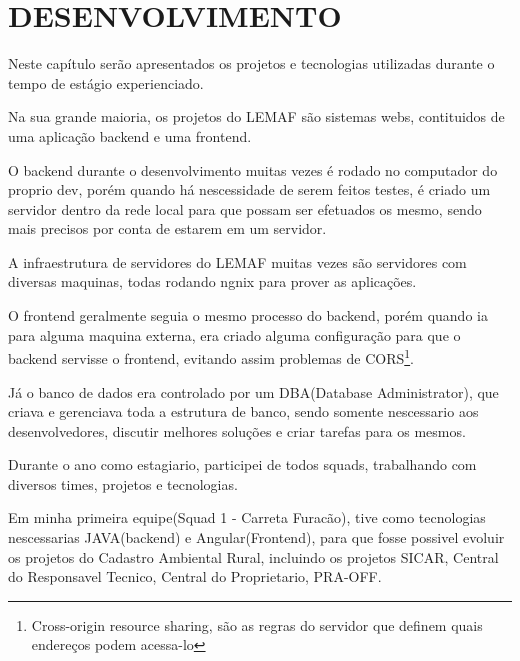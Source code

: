 \chapter{DESENVOLVIMENTO}
\label{cap:desenvolvimento}

Neste capítulo serão apresentados os projetos e tecnologias utilizadas durante o tempo de estágio experienciado.

Na sua grande maioria, os projetos do LEMAF são sistemas webs, contituidos de uma aplicação backend e uma frontend.

O backend durante o desenvolvimento muitas vezes é rodado no computador do proprio dev, porém quando há nescessidade de serem feitos testes, é criado um servidor dentro da rede local para que possam ser efetuados os mesmo, sendo mais precisos por conta de estarem em um servidor.

A infraestrutura de servidores do LEMAF muitas vezes são servidores com diversas maquinas, todas rodando ngnix para prover as aplicações.

O frontend geralmente seguia o mesmo processo do backend, porém quando ia para alguma maquina externa, era criado alguma configuração para que o backend servisse o frontend, evitando assim problemas de CORS\footnote{Cross-origin resource sharing, são as regras do servidor que definem quais endereços podem acessa-lo}.

Já o banco de dados era controlado por um DBA(Database Administrator), que criava e gerenciava toda a estrutura de banco, sendo somente nescessario aos desenvolvedores, discutir melhores soluções e criar tarefas para os mesmos.

Durante o ano como estagiario, participei de todos squads, trabalhando com diversos times, projetos e tecnologias.

Em minha primeira equipe(Squad 1 - Carreta Furacão), tive como tecnologias nescessarias JAVA(backend) e Angular(Frontend), para que fosse possivel evoluir os projetos do Cadastro Ambiental Rural, incluindo os projetos SICAR, Central do Responsavel Tecnico, Central do Proprietario, PRA-OFF.


